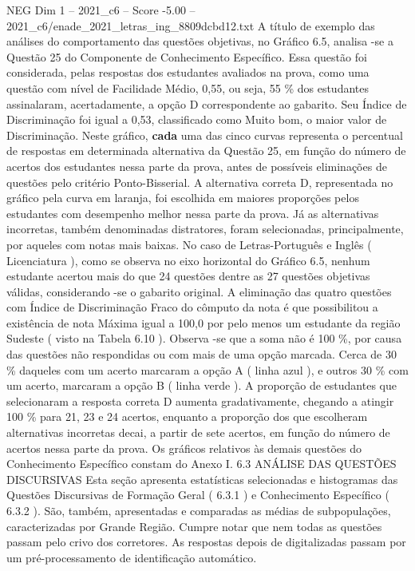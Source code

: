 \begin{textsample}{NEG Dim 1 – 2021\_c6 – Score -5.00 – 2021\_c6/enade\_2021\_letras\_ing\_8809dcbd12.txt}
A título de exemplo das análises do comportamento das questões objetivas, no Gráfico 6.5, analisa -se a Questão 25 do Componente de Conhecimento Específico.
Essa questão foi considerada, pelas respostas dos estudantes avaliados na prova, como uma questão com nível de Facilidade Médio, 0,55, ou seja, 55 \% dos estudantes assinalaram, acertadamente, a opção D correspondente ao gabarito.
Seu Índice de Discriminação foi igual a 0,53, classificado como Muito bom, o maior valor de Discriminação.
Neste gráfico, \textbf{cada} uma das cinco curvas representa o percentual de respostas em determinada alternativa da Questão 25, em função do número de acertos dos estudantes nessa parte da prova, antes de possíveis eliminações de questões pelo critério Ponto-Bisserial.
A alternativa correta D, representada no gráfico pela curva em laranja, foi escolhida em maiores proporções pelos estudantes com desempenho melhor nessa parte da prova.
Já as alternativas incorretas, também denominadas distratores, foram selecionadas, principalmente, por aqueles com notas mais baixas.
No caso de Letras-Português e Inglês ( Licenciatura ), como se observa no eixo horizontal do Gráfico 6.5, nenhum estudante acertou mais do que 24 questões dentre as 27 questões objetivas válidas, considerando -se o gabarito original.
A eliminação das quatro questões com Índice de Discriminação Fraco do cômputo da nota é que possibilitou a existência de nota Máxima igual a 100,0 por pelo menos um estudante da região Sudeste ( visto na Tabela 6.10 ).
Observa -se que a soma não é 100 \%, por causa das questões não respondidas ou com mais de uma opção marcada.
Cerca de 30 \% daqueles com um acerto marcaram a opção A ( linha azul ), e outros 30 \% com um acerto, marcaram a opção B ( linha verde ).
A proporção de estudantes que selecionaram a resposta correta D aumenta gradativamente, chegando a atingir 100 \% para 21, 23 e 24 acertos, enquanto a proporção dos que escolheram alternativas incorretas decai, a partir de sete acertos, em função do número de acertos nessa parte da prova.
Os gráficos relativos às demais questões do Conhecimento Específico constam do Anexo I. 6.3 ANÁLISE DAS QUESTÕES DISCURSIVAS Esta seção apresenta estatísticas selecionadas e histogramas das Questões Discursivas de Formação Geral ( 6.3.1 ) e Conhecimento Específico ( 6.3.2 ).
São, também, apresentadas e comparadas as médias de subpopulações, caracterizadas por Grande Região.
Cumpre notar que nem todas as questões passam pelo crivo dos corretores.
As respostas depois de digitalizadas passam por um pré-processamento de identificação automático.

\end{textsample}
